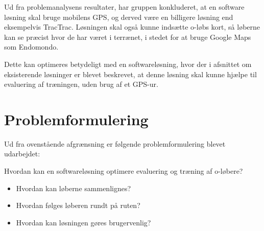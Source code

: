 Ud fra problemanalysens resultater, har gruppen konkluderet, at en software løsning skal bruge mobilens GPS, og derved være en billigere løsning end eksempelvis TracTrac. Løsningen skal også kunne indsætte o-løbs kort, så løberne kan se præcist hvor de har været i terrænet, i stedet for at bruge Google Maps som Endomondo. 

Dette kan optimeres betydeligt med en softwareløsning, hvor der i afsnittet om eksisterende løsninger er blevet beskrevet, at denne løsning skal kunne hjælpe til evaluering af træningen, uden brug af et GPS-ur.

\section{Problemformulering}
Ud fra ovenstående afgrænsning er følgende problemformulering blevet udarbejdet:

Hvordan kan en softwareløsning optimere evaluering og træning af o-løbere?
\begin{itemize}
	\item Hvordan kan løberne sammenlignes?
	\item Hvordan følges løberen rundt på ruten?
	\item Hvordan kan løsningen gøres brugervenlig?
\end{itemize}
